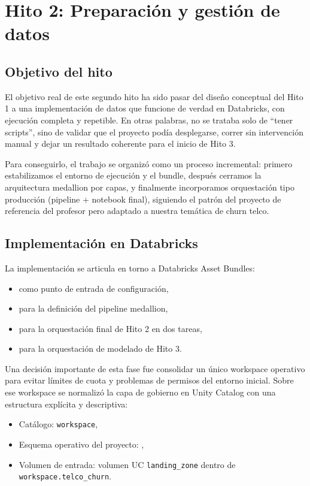 \documentclass[12pt,a4paper]{article}
\begin{document}
\section{Hito 2: Preparación y gestión de datos}

\subsection{Objetivo del hito}

El objetivo real de este segundo hito ha sido pasar del diseño conceptual del Hito 1 a una implementación de datos que funcione de verdad en Databricks, con ejecución completa y repetible. En otras palabras, no se trataba solo de ``tener scripts'', sino de validar que el proyecto podía desplegarse, correr sin intervención manual y dejar un resultado coherente para el inicio de Hito 3.

Para conseguirlo, el trabajo se organizó como un proceso incremental: primero estabilizamos el entorno de ejecución y el bundle, después cerramos la arquitectura medallion por capas, y finalmente incorporamos orquestación tipo producción (pipeline + notebook final), siguiendo el patrón del proyecto de referencia del profesor pero adaptado a nuestra temática de churn telco.

\subsection{Implementación en Databricks}

La implementación se articula en torno a Databricks Asset Bundles:
\begin{itemize}
    \item {} como punto de entrada de configuración,
    \item {} para la definición del pipeline medallion,
    \item {} para la orquestación final de Hito 2 en dos tareas,
    \item {} para la orquestación de modelado de Hito 3.
\end{itemize}

Una decisión importante de esta fase fue consolidar un único workspace operativo para evitar límites de cuota y problemas de permisos del entorno inicial. Sobre ese workspace se normalizó la capa de gobierno en Unity Catalog con una estructura explícita y descriptiva:
\begin{itemize}
    \item Catálogo: \texttt{workspace},
    \item Esquema operativo del proyecto: ,
    \item Volumen de entrada: volumen UC \texttt{landing\_zone} dentro de \texttt{workspace.telco\_churn}.
\end{itemize}
\end{document}
